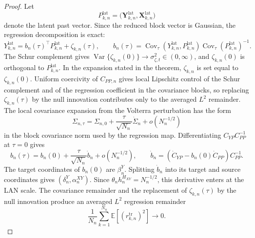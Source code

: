 \documentclass[11pt,a4paper]{amsart}
\theoremstyle{plain}
\theoremstyle{definition}
\theoremstyle{remark}
\DeclareMathOperator{\Var}{Var}
\DeclareMathOperator{\Cov}{Cov}
\newcommand{\EE}{\mathbb{E}}
\begin{document}
\begin{proof}
Let
\[
        P_{k,n}^{\mathrm{lat}}
        =
        \bigl(
        \mathbf Y_{k,n}^{\mathrm{lat}},
        \mathbf X_{k,n}^{\mathrm{lat}}
        \bigr)
\]
denote the latent past vector.  Since the reduced block vector is Gaussian, the regression
decomposition is exact:
\[
        Y_{k,n}^{\mathrm{lat}}
        =
        b_n(\tau)^\top P_{k,n}^{\mathrm{lat}}
        +
        \zeta_{k,n}(\tau),
        \qquad
        b_n(\tau)
        =
        \Cov_\tau(Y_{k,n}^{\mathrm{lat}},P_{k,n}^{\mathrm{lat}})
        \Cov_\tau(P_{k,n}^{\mathrm{lat}})^{-1}.
\]
The Schur complement gives
\(\Var\{\zeta_{k,n}(0)\}\to\sigma_{\zeta,t}^2\in(0,\infty)\), and
\(\zeta_{k,n}(0)\) is orthogonal to \(P_{k,n}^{\mathrm{lat}}\).  In the expansion stated in the
theorem, \(\zeta_{k,n}\) is set equal to \(\zeta_{k,n}(0)\).  Uniform coercivity of \(C_{PP,n}\) gives local
Lipschitz control of the Schur complement and of the regression coefficient in the covariance
blocks, so replacing \(\zeta_{k,n}(\tau)\) by the null innovation contributes only to the averaged
\(L^2\) remainder.
The local covariance expansion from the Volterra perturbation has the form
\[
        \Sigma_{n,\tau}
        =
        \Sigma_{n,0}
        +
        \frac{\tau}{\sqrt{N_n}}\dot\Sigma_n
        +
        o(N_n^{-1/2})
\]
in the block covariance norm used by the regression map.  Differentiating
\(C_{YP}C_{PP}^{-1}\) at \(\tau=0\) gives
\[
        b_n(\tau)
        =
        b_n(0)
        +
        \frac{\tau}{\sqrt{N_n}}
        \dot b_n
        +
        o(N_n^{-1/2}),
        \qquad
        \dot b_n
        =
        (\dot C_{YP}-b_n(0)\dot C_{PP})C_{PP}^{-1}.
\]
The target coordinates of \(b_n(0)\) are \(\beta_n^Y\).  Splitting \(\dot b_n\) into its target and
source coordinates gives \((\delta_n^Y,\alpha_n^{XY})\).  Since
\(\theta_nh_n^{H_{XY}}=N_n^{-1/2}\), this derivative enters at the LAN scale.  The covariance
remainder and the replacement of \(\zeta_{k,n}(\tau)\) by the null innovation produce an averaged
\(L^2\) regression remainder
\[
        \frac1{N_n}\sum_{k=1}^{N_n}\EE[(r_{k,n}^{\mathrm{tr}})^2]\to0.
\]


\end{proof}
\end{document}
